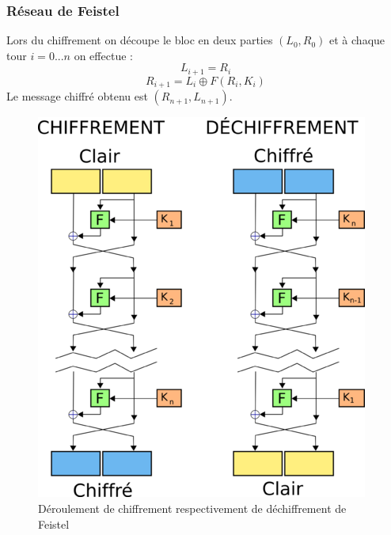 \documentclass[12pt, a4paper]{article}
\begin{document}
	\subsubsection{Réseau de Feistel}
	Lors du chiffrement on découpe le bloc en deux parties $(L_{0}, R_{0})$ et à
	chaque tour $i = 0...n$ on effectue :
	\[ L_{i+1} = R_{i} \]
	\[ R_{i+1} = L_{i} \oplus F(R_{i}, K_{i}) \]
	Le message chiffré obtenu est $(R_{n+1}, L_{n+1})$.
	\begin{figure}[!ht]
		\centering
		\includegraphics[scale=0.9]{images/feistel}
		\caption{Déroulement de chiffrement respectivement de déchiffrement de
		Feistel}
		\label{fig:feistel}
	\end{figure}
\end{document}
